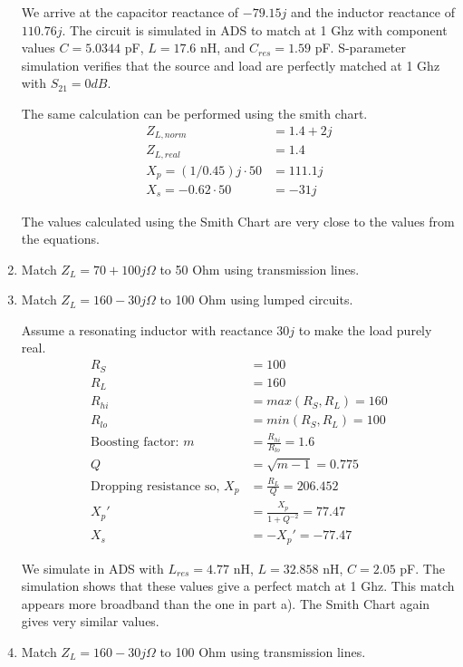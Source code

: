 \begin{enumerate}[label=(\alph*)]
    We arrive at the capacitor reactance of $-79.15j$ and the inductor reactance of $110.76j$.
    The circuit is simulated in ADS to match at 1 Ghz with component values $C = 5.0344$ pF, $L = 17.6$ nH, and $C_{res} = 1.59$ pF.
    S-parameter simulation verifies that the source and load are perfectly matched at 1 Ghz with $S_{21} = 0 dB$.

    The same calculation can be performed using the smith chart.
    \begin{align*}
        Z_{L,norm} &= 1.4 + 2j \\
        Z_{L,real} &= 1.4 \\
        X_p = (1/0.45)j \cdot 50 &= 111.1j \\
        X_s = -0.62 \cdot 50 &= -31j
    \end{align*}

    The values calculated using the Smith Chart are very close to the values from the equations.

    \item Match $Z_L = 70 + 100j \Omega$ to 50 Ohm using transmission lines.
    \item Match $Z_L = 160 - 30j \Omega$ to 100 Ohm using lumped circuits.

    Assume a resonating inductor with reactance $30j$ to make the load purely real.
    \begin{align*}
        R_S &= 100 \\
        R_L &= 160 \\
        R_{hi} &= max(R_S, R_L) = 160 \\
        R_{lo} &= min(R_S, R_L) = 100 \\
        \text{Boosting factor: } m &= \frac{R_{hi}}{R_{lo}} = 1.6 \\
        Q &= \sqrt{m-1} = 0.775 \\
        \text{Dropping resistance so, } X_p &= \frac{R_L}{Q} = 206.452 \\
        X_p' &= \frac{X_p}{1 + Q^{-2}} = 77.47 \\
        X_s &= -X_p' = -77.47
    \end{align*}

    We simulate in ADS with $L_{res} = 4.77$ nH, $L = 32.858$ nH, $C = 2.05$ pF.
    The simulation shows that these values give a perfect match at 1 Ghz. This match appears more broadband than the one in part a). The Smith Chart again gives very similar values.

    \item Match $Z_L = 160-30j \Omega$ to 100 Ohm using transmission lines.


\end{enumerate}
